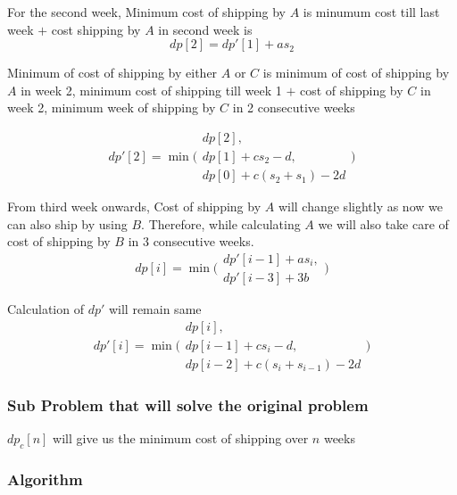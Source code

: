 \documentclass[12pt]{article}
\begin{document}
For the second week,
Minimum cost of shipping by $A$ is minumum cost till last week $+$ cost shipping by $A$ in second week is 
$$dp[2] = dp'[1] + a s_2$$

Minimum of cost of shipping by either $A$ or $C$ is minimum of 
cost of shipping by $A$ in week 2, minimum cost of shipping till week 1 $+$ cost of shipping by $C$ in week 2, minimum week of shipping by $C$ in 2 consecutive weeks 

$$dp'[2] = \min 
    \Biggl(
        \begin{array}{cc}
             dp[2], \\
             dp[1] + c s_2 - d, \\
             dp[0] + c (s_2 + s_1) - 2 d
        \end{array}
    \Biggr)
$$

From third week onwards, 
Cost of shipping by $A$ will change slightly as now we can also ship by using $B$.
Therefore, while calculating $A$ we will also take care of cost of shipping by $B$ in 3 consecutive weeks.\\

$$dp[i] = \min
            \Biggl(
            \begin{array}{c}
                 dp'[i-1] + a s_i, \\
                 dp'[i-3] + 3b
            \end{array}
            \Biggr)
$$

Calculation of $dp'$ will remain same\\
$$dp'[i] = \min
            \Biggl(
            \begin{array}{c}
                 dp[i], \\
                 dp[i-1] + cs_i - d, \\
                 dp[i-2] + c(s_i + s_{i-1}) - 2 d
            \end{array}
            \Biggr)
$$
\subsubsection{Sub Problem that will solve the original problem}

$dp_c[n]$ will give us the minimum cost of shipping over $n$ weeks

\subsubsection{Algorithm}
\end{document}
